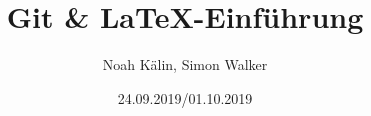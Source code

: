 \documentclass{beamer}
\title{Git \& \LaTeX-Einführung}
\author{Noah Kälin, Simon Walker}
\date{24.09.2019/01.10.2019}
\begin{document}
\frame{\titlepage}



\end{document}
